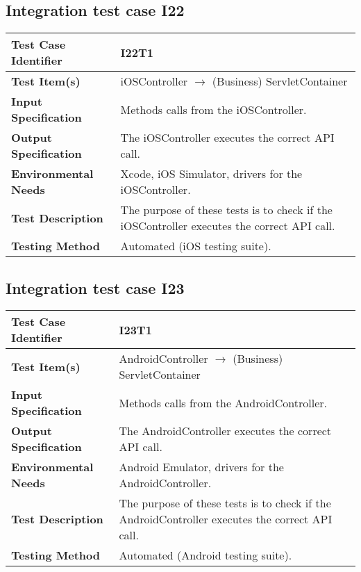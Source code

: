 \vspace{2em}

\subsection {Integration test case I22}

\indent

\vspace{1em}

\begin{tabular}{l p{}}
    \hline
    \textbf{Test Case Identifier} & I22T1\\
    \hline
    \textbf{Test Item(s)} & iOSController $\rightarrow$ (Business) ServletContainer \\
    \hline
    \textbf{Input Specification} &  Methods calls from the iOSController. \\
    \hline
    \textbf{Output Specification} &  The iOSController executes the correct API call. \\
    \hline
    \textbf{Environmental Needs} & Xcode, iOS Simulator, drivers for the iOSController. \\
    \hline
    \textbf{Test Description} & The purpose of these tests is to check if the iOSController executes the correct API call.  \\
    \hline
    \textbf{Testing Method} & Automated (iOS testing suite). \\
    \hline
\end{tabular}

\vspace{2em}

\subsection {Integration test case I23}

\indent

\vspace{1em}

\begin{tabular}{l p{}}
    \hline
    \textbf{Test Case Identifier} & I23T1\\
    \hline
    \textbf{Test Item(s)} & AndroidController $\rightarrow$ (Business) ServletContainer \\
    \hline
    \textbf{Input Specification} &  Methods calls from the AndroidController. \\
    \hline
    \textbf{Output Specification} &  The AndroidController executes the correct API call. \\
    \hline
    \textbf{Environmental Needs} & Android Emulator, drivers for the AndroidController. \\
    \hline
    \textbf{Test Description} & The purpose of these tests is to check if the AndroidController executes the correct API call.  \\
    \hline
    \textbf{Testing Method} & Automated (Android testing suite). \\
    \hline
\end{tabular}

